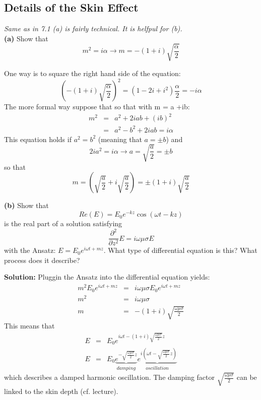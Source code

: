 \subsection{Details of the Skin Effect}
\textit{Same as in 7.1 (a) is fairly technical. It is helfpul for (b).}\\

\textbf{(a)} Show that
$$
m^2 = i\alpha \rightarrow m=-(1+i)\sqrt{\frac{\alpha}{2}}
$$
\ifanswers
    \begin{tcolorbox}[enhanced jigsaw,breakable,pad at break*=1mm,
    colback=blue!5!white,colframe=babyblueeyes,title=Solutions,
    watermark color=white]
    One way is to square the right hand side of the equation:
    $$\left(-(1+i)\sqrt{\frac{\alpha}{2}}\right)^2 = (1-2i+i^2)\frac{\alpha}{2} = -i\alpha$$
    The more formal way suppose that so that with m = a +ib:
    \begin{eqnarray*}
    m^2 &=& a^2+2iab+(ib)^2 \\
    &=& a^2 - b^2+2iab = i\alpha
    \end{eqnarray*}
    This equation holds if $a^2 = b^2$ (meaning that $a=\pm b$) and
    $$2ia^2 = i\alpha \rightarrow a=\sqrt{\frac{a}{2}}=\pm b$$
    so that
    $$m=(\sqrt{\frac{a}{2}}+i\sqrt{\frac{a}{2}}) = \pm(1+i)\sqrt{\frac{a}{2}}$$
    
\end{tcolorbox}
\fi
\textbf{(b)} Show that
$$
Re(E) = E_0e^{-kz}\cos(\omega t - kz)
$$
is the real part of a solution satisfying
$$
\frac{\partial^2}{\partial z^2}E = i\omega \mu \sigma E
$$
with the Ansatz: $E = E_0e^{i\omega t+mz}$. What type of differential equation is this? What process does it describe?
\ifanswers
    \begin{tcolorbox}[enhanced jigsaw,breakable,pad at break*=1mm,
    colback=blue!5!white,colframe=babyblueeyes,title=Solutions,
    watermark color=white]
    \textbf{Solution:} Pluggin the Ansatz into the differential equation yields:
    \begin{eqnarray*}
    m^2E_0e^{i\omega t + mz} &=& i\omega \mu \sigma E_0 e^{i\omega t + mz} \\
    m^2 &=& i\omega \mu \sigma \\
    m &=& -(1+i)\sqrt{\frac{\omega \mu \sigma}{2}}
    \end{eqnarray*}
    This means that
    \begin{eqnarray*}
    E &=& E_0e^{i\omega t -(1+i)\sqrt{\frac{\omega \mu \sigma}{2}}z} \\
    E &=&E_0\underbrace{e^{-\sqrt{\frac{\omega \mu \sigma}{2}}z}}_{damping}\underbrace{e^{i(\omega t - \sqrt{\frac{\omega \mu \sigma}{2}}z)}}_{oscillation}
    \end{eqnarray*}
    which describes a damped harmonic oscillation. The damping factor $\sqrt{\frac{\omega \mu \sigma}{2}}$ can be linked to the skin depth (cf. lecture).
    
\end{tcolorbox}
\fi